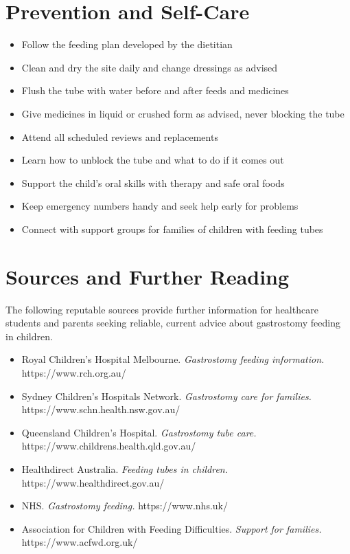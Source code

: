 \section*{Prevention and Self-Care}
\begin{itemize}
    \item Follow the feeding plan developed by the dietitian
    \item Clean and dry the site daily and change dressings as advised
    \item Flush the tube with water before and after feeds and medicines
    \item Give medicines in liquid or crushed form as advised, never blocking the tube
    \item Attend all scheduled reviews and replacements
    \item Learn how to unblock the tube and what to do if it comes out
    \item Support the child's oral skills with therapy and safe oral foods
    \item Keep emergency numbers handy and seek help early for problems
    \item Connect with support groups for families of children with feeding tubes
\end{itemize}

\section*{Sources and Further Reading}
The following reputable sources provide further information for healthcare students and parents seeking reliable, current advice about gastrostomy feeding in children.
\begin{itemize}
    \item Royal Children's Hospital Melbourne. \textit{Gastrostomy feeding information.} https://www.rch.org.au/
    \item Sydney Children's Hospitals Network. \textit{Gastrostomy care for families.} https://www.schn.health.nsw.gov.au/
    \item Queensland Children's Hospital. \textit{Gastrostomy tube care.} https://www.childrens.health.qld.gov.au/
    \item Healthdirect Australia. \textit{Feeding tubes in children.} https://www.healthdirect.gov.au/
    \item NHS. \textit{Gastrostomy feeding.} https://www.nhs.uk/
    \item Association for Children with Feeding Difficulties. \textit{Support for families.} https://www.acfwd.org.uk/
\end{itemize}

